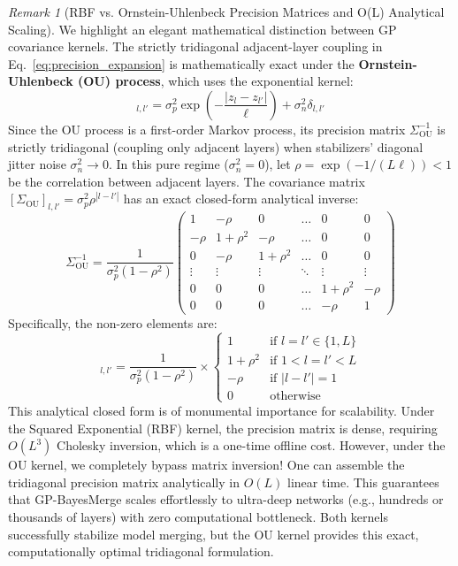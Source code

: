 \documentclass{article}
\theoremstyle{plain}
\theoremstyle{definition}
\theoremstyle{remark}
\newtheorem{remark}{Remark}
\begin{document}
\begin{remark}[RBF vs. Ornstein-Uhlenbeck Precision Matrices and O(L) Analytical Scaling]
\label{rem:ou_appendix}
We highlight an elegant mathematical distinction between GP covariance kernels. The strictly tridiagonal adjacent-layer coupling in Eq.~\ref{eq:precision_expansion} is mathematically exact under the \textbf{Ornstein-Uhlenbeck (OU) process}, which uses the exponential kernel:
\begin{equation}
[\Sigma_{\text{OU}}]_{l, l'} = \sigma_p^2 \exp\left( - \frac{|z_l - z_{l'}|}{\ell} \right) + \sigma_n^2 \delta_{l, l'}
\label{eq:ou_kernel_appendix}
\end{equation}
Since the OU process is a first-order Markov process, its precision matrix $\Sigma_{\text{OU}}^{-1}$ is strictly tridiagonal (coupling only adjacent layers) when stabilizers' diagonal jitter noise $\sigma_n^2 \to 0$. In this pure regime ($\sigma_n^2 = 0$), let $\rho = \exp(-1 / (L \ell)) < 1$ be the correlation between adjacent layers. The covariance matrix $[\Sigma_{\text{OU}}]_{l, l'} = \sigma_p^2 \rho^{|l - l'|}$ has an exact closed-form analytical inverse:
\begin{equation}
\Sigma_{\text{OU}}^{-1} = \frac{1}{\sigma_p^2(1 - \rho^2)}
\begin{pmatrix}
1 & -\rho & 0 & \dots & 0 & 0 \\
-\rho & 1+\rho^2 & -\rho & \dots & 0 & 0 \\
0 & -\rho & 1+\rho^2 & \dots & 0 & 0 \\
\vdots & \vdots & \vdots & \ddots & \vdots & \vdots \\
0 & 0 & 0 & \dots & 1+\rho^2 & -\rho \\
0 & 0 & 0 & \dots & -\rho & 1
\end{pmatrix}
\label{eq:ou_analytic_inverse}
\end{equation}
Specifically, the non-zero elements are:
\begin{equation}
[\Sigma_{\text{OU}}^{-1}]_{l, l'} = \frac{1}{\sigma_p^2(1-\rho^2)} \times
\begin{cases}
1 & \text{if } l = l' \in \{1, L\} \\
1 + \rho^2 & \text{if } 1 < l = l' < L \\
-\rho & \text{if } |l - l'| = 1 \\
0 & \text{otherwise}
\end{cases}
\label{eq:ou_elements_appendix}
\end{equation}
This analytical closed form is of monumental importance for scalability. Under the Squared Exponential (RBF) kernel, the precision matrix is dense, requiring $O(L^3)$ Cholesky inversion, which is a one-time offline cost. However, under the OU kernel, we completely bypass matrix inversion! One can assemble the tridiagonal precision matrix analytically in $O(L)$ linear time. This guarantees that GP-BayesMerge scales effortlessly to ultra-deep networks (e.g., hundreds or thousands of layers) with zero computational bottleneck. Both kernels successfully stabilize model merging, but the OU kernel provides this exact, computationally optimal tridiagonal formulation.
\end{remark}
\end{document}
